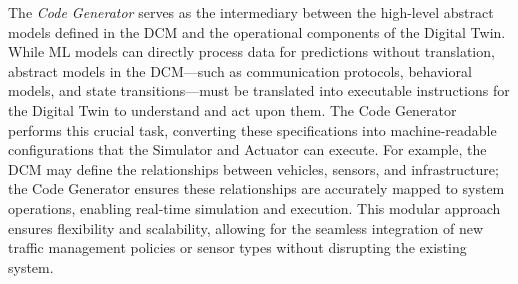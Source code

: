 The \textit{Code Generator} serves as the intermediary between the high-level abstract models defined in the DCM and the operational components of the Digital Twin. While ML models can directly process data for predictions without translation, abstract models in the DCM—such as communication protocols, behavioral models, and state transitions—must be translated into executable instructions for the Digital Twin to understand and act upon them. The Code Generator performs this crucial task, converting these specifications into machine-readable configurations that the Simulator and Actuator can execute. For example, the DCM may define the relationships between vehicles, sensors, and infrastructure; the Code Generator ensures these relationships are accurately mapped to system operations, enabling real-time simulation and execution. This modular approach ensures flexibility and scalability, allowing for the seamless integration of new traffic management policies or sensor types without disrupting the existing system.

